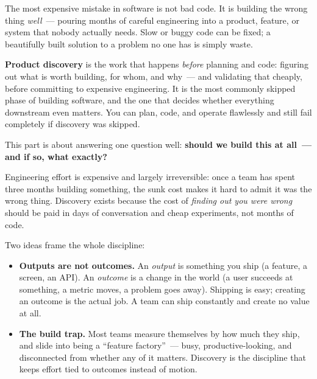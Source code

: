 \label{ch:product-discovery}


\chapterrule

The most expensive mistake in software is not bad code. It is building the wrong thing \emph{well}~---
pouring months of careful engineering into a product, feature, or system that nobody actually
needs. Slow or buggy code can be fixed; a beautifully built solution to a problem no one has is
simply waste.

\textbf{Product discovery} is the work that happens \emph{before} planning and code: figuring out what is
worth building, for whom, and why~--- and validating that cheaply, before committing to expensive
engineering. It is the most commonly skipped phase of building software, and the one that decides
whether everything downstream even matters. You can plan, code, and operate flawlessly and still
fail completely if discovery was skipped.

This part is about answering one question well: \textbf{should we build this at all~--- and if so, what
exactly?}

\label{product-discovery:why-discovery-exists-the-cost-of-building-the-wrong-thing}

Engineering effort is expensive and largely irreversible: once a team has spent three months
building something, the sunk cost makes it hard to admit it was the wrong thing. Discovery exists
because the cost of \emph{finding out you were wrong} should be paid in days of conversation and cheap
experiments, not months of code.

Two ideas frame the whole discipline:

\begin{itemize}
\tightlist
\item
  \textbf{Outputs are not outcomes.} An \emph{output} is something you ship (a feature, a screen, an API). An
  \emph{outcome} is a change in the world (a user succeeds at something, a metric moves, a problem goes
  away). Shipping is easy; creating an outcome is the actual job. A team can ship constantly and
  create no value at all.
\item
  \textbf{The build trap.} Most teams measure themselves by how much they ship, and slide into being a
  ``feature factory''~--- busy, productive-looking, and disconnected from whether any of it matters.
  Discovery is the discipline that keeps effort tied to outcomes instead of motion.
\end{itemize}

